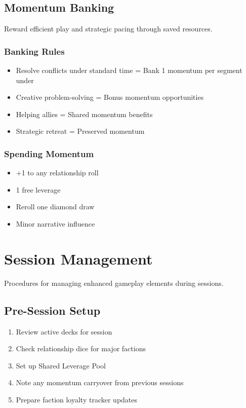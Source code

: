 \subsection{Momentum Banking}

Reward efficient play and strategic pacing through saved resources.

\subsubsection{Banking Rules}

\begin{itemize}
\item Resolve conflicts under standard time = Bank 1 momentum per segment under
\item Creative problem-solving = Bonus momentum opportunities
\item Helping allies = Shared momentum benefits
\item Strategic retreat = Preserved momentum
\end{itemize}

\subsubsection{Spending Momentum}

\begin{itemize}
\item +1 to any relationship roll
\item 1 free leverage
\item Reroll one diamond draw
\item Minor narrative influence
\end{itemize}

\section{Session Management}

Procedures for managing enhanced gameplay elements during sessions.

\subsection{Pre-Session Setup}

\begin{enumerate}
\item Review active decks for session
\item Check relationship dice for major factions
\item Set up Shared Leverage Pool
\item Note any momentum carryover from previous sessions
\item Prepare faction loyalty tracker updates
\end{enumerate}

